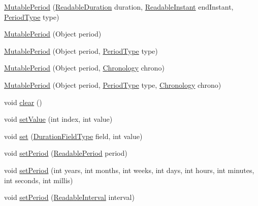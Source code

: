 \begin{DoxyCompactItemize}
\item 
\hyperlink{classorg_1_1joda_1_1time_1_1_mutable_period_a7afeea8731f4fe5d5cb61bbdf46727a8}{Mutable\-Period} (\hyperlink{interfaceorg_1_1joda_1_1time_1_1_readable_duration}{Readable\-Duration} duration, \hyperlink{interfaceorg_1_1joda_1_1time_1_1_readable_instant}{Readable\-Instant} end\-Instant, \hyperlink{classorg_1_1joda_1_1time_1_1_period_type}{Period\-Type} type)
\item 
\hyperlink{classorg_1_1joda_1_1time_1_1_mutable_period_abd00ded18a6c58a97131aeee27dc162d}{Mutable\-Period} (Object period)
\item 
\hyperlink{classorg_1_1joda_1_1time_1_1_mutable_period_af6c0ed52a62152fe44de89329a0c2c1a}{Mutable\-Period} (Object period, \hyperlink{classorg_1_1joda_1_1time_1_1_period_type}{Period\-Type} type)
\item 
\hyperlink{classorg_1_1joda_1_1time_1_1_mutable_period_a0d408b05aeb1153a798d393cc08b62b3}{Mutable\-Period} (Object period, \hyperlink{classorg_1_1joda_1_1time_1_1_chronology}{Chronology} chrono)
\item 
\hyperlink{classorg_1_1joda_1_1time_1_1_mutable_period_ad36ccb9677859081d71abbabe5fc07d8}{Mutable\-Period} (Object period, \hyperlink{classorg_1_1joda_1_1time_1_1_period_type}{Period\-Type} type, \hyperlink{classorg_1_1joda_1_1time_1_1_chronology}{Chronology} chrono)
\item 
void \hyperlink{classorg_1_1joda_1_1time_1_1_mutable_period_a810619f0dcc5f9f475073a03ee1a9043}{clear} ()
\item 
void \hyperlink{classorg_1_1joda_1_1time_1_1_mutable_period_ad00c127b49957ab477750fb16837596a}{set\-Value} (int index, int value)
\item 
void \hyperlink{classorg_1_1joda_1_1time_1_1_mutable_period_a6e27b588c2c2df7378d6523fdeb5cfc8}{set} (\hyperlink{classorg_1_1joda_1_1time_1_1_duration_field_type}{Duration\-Field\-Type} field, int value)
\item 
void \hyperlink{classorg_1_1joda_1_1time_1_1_mutable_period_a78a9a45edb58b08c10616acedbe8a221}{set\-Period} (\hyperlink{interfaceorg_1_1joda_1_1time_1_1_readable_period}{Readable\-Period} period)
\item 
void \hyperlink{classorg_1_1joda_1_1time_1_1_mutable_period_a38210e172cde22e564aad439770a7a29}{set\-Period} (int years, int months, int weeks, int days, int hours, int minutes, int seconds, int millis)
\item 
void \hyperlink{classorg_1_1joda_1_1time_1_1_mutable_period_ac7f6ef9a0a6583c1f4f90a233ddd7eb2}{set\-Period} (\hyperlink{interfaceorg_1_1joda_1_1time_1_1_readable_interval}{Readable\-Interval} interval)

\end{DoxyCompactItemize}
